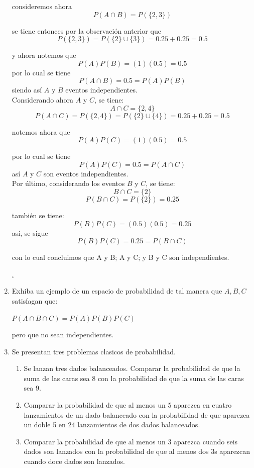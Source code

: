 \documentclass[12pt,a4paper]{report}
\begin{document}
\begin{enumerate}
{		consideremos ahora
			$$ P( A \cap B ) = P(\{ 2,3 \})$$

		se tiene entonces por la observación anterior que
			$$ P(\{ 2,3 \}) = P(\{ 2 \} \cup \{ 3 \} ) = 0.25 + 0.25 = 0.5$$

		y ahora notemos que
			$$ P(A)P(B) = (1)(0.5) = 0.5 $$
		por lo cual se tiene
			$$ P(A \cap B) = 0.5 = P(A)P(B) $$
		siendo así $A$ y $B$ eventos independientes.\\

		Considerando ahora $A$ y $C$, se tiene:
			$$ A \cap C = \{ 2,4 \}$$
			$$ P( A \cap C ) = P(\{ 2,4 \}) = P(\{ 2 \} \cup \{ 4 \} ) = 0.25 + 0.25 = 0.5 $$

		notemos ahora que
			$$ P(A)P(C) = (1)(0.5) = 0.5 $$

		por lo cual se tiene
			$$ P(A)P(C) = 0.5 = P( A \cap C ) $$
		así $A$ y $C$ son eventos independientes.\\

		Por último, considerando los eventos $B$ y $C$, se tiene:
			$$ B \cap C = \{ 2 \}$$
			$$ P( B \cap C ) = P(\{ 2 \}) = 0.25 $$

		también se tiene:
			$$ P(B)P(C) = (0.5)(0.5) = 0.25 $$
		así, se sigue
			$$ P(B)P(C) = 0.25 =  P( B \cap C )$$

		con lo cual concluimos que A y B; A y C; y B y C son independientes.
		\begin{flushright}
			$_{\square}$
		\end{flushright}

	}

   \item {
  Exhiba un ejemplo de un espacio de probabilidad de tal manera que $A,B,C$ satisfagan que: \\
  \begin{center}
  $P(A\cap B \cap C) = P(A)P(B)P(C)$
  \end{center}
  pero que no sean independientes.
	}

   \item {
    Se presentan tres problemas clasicos de probabilidad.

    \begin{enumerate}[label=\alph*) ]
    \item{Se lanzan tres dados balanceados. Comparar la probabilidad de que la suma de las caras sea 8 con la probabilidad de que la suma de las caras sea 9.
    }\\

    \item{Comparar la probabilidad de que al menos un 5 aparezca en cuatro lanzamientos de un dado balanceado con la probabilidad de que aparezca un doble 5 en 24 lanzamientos de dos dados balanceados.} \\
    \item{Comparar la probabilidad de que al menos un 3 aparezca cuando seis dados son lanzados con la probabilidad de que al menos dos 3s aparezcan cuando doce dados son lanzados.}
    \end{enumerate}
	}



\end{enumerate}
\end{document}
